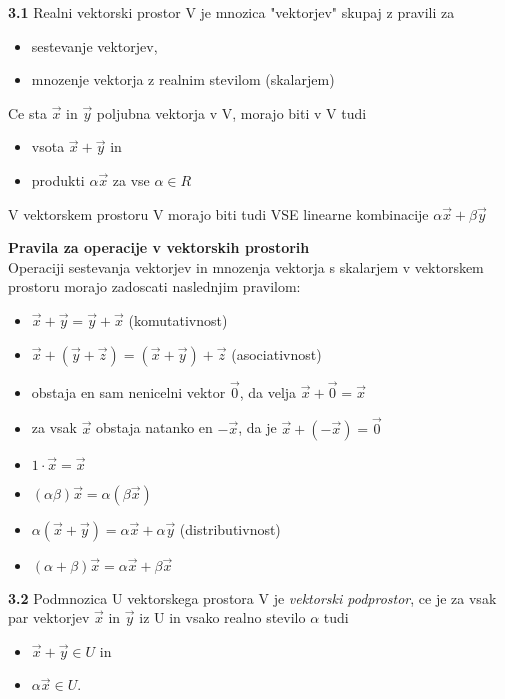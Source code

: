 \documentclass{article}
\begin{document}
\begin{multicols}{4}
	\textbf{3.1} Realni vektorski prostor V je mnozica "vektorjev" skupaj z pravili za
	\begin{itemize}
		\item sestevanje vektorjev,
		\item mnozenje vektorja z realnim stevilom (skalarjem)
	\end{itemize}
	Ce sta $\vec{x}$ in $\vec{y}$ poljubna vektorja v V, morajo biti v V tudi
	\begin{itemize}
		\item vsota $\vec{x} + \vec{y}$ in
		\item produkti $\alpha\vec{x}$ za vse $\alpha \in R$
	\end{itemize}
	V vektorskem prostoru V morajo biti tudi VSE linearne kombinacije
	$\alpha\vec{x} + \beta\vec{y}$

	\textbf{Pravila za operacije v vektorskih prostorih}\\
	Operaciji sestevanja vektorjev in mnozenja vektorja s skalarjem v vektorskem prostoru
	morajo zadoscati naslednjim pravilom:
	\begin{itemize}
		\item $\vec{x} + \vec{y} = \vec{y} + \vec{x}$ (komutativnost)
		\item $\vec{x} + (\vec{y} + \vec{z}) = (\vec{x} + \vec{y}) + \vec{z}$ (asociativnost)
		\item obstaja en sam nenicelni vektor $\vec{0}$, da velja $\vec{x} + \vec{0} = \vec{x}$
		\item za vsak $\vec{x}$ obstaja natanko en $-\vec{x}$, da je $\vec{x} + (-\vec{x}) = \vec{0}$
		\item $1 \cdot \vec{x} = \vec{x}$
		\item $(\alpha\beta)\vec{x} = \alpha(\beta\vec{x})$
		\item $\alpha(\vec{x} + \vec{y}) = \alpha\vec{x} + \alpha\vec{y}$ (distributivnost)
		\item $(\alpha + \beta)\vec{x} = \alpha\vec{x} + \beta\vec{x}$
	\end{itemize}

	\textbf{3.2} Podmnozica U vektorskega prostora V je \textit{vektorski podprostor}, ce je za
	vsak par vektorjev $\vec{x}$ in $\vec{y}$ iz U in vsako realno stevilo $\alpha$ tudi
	\begin{itemize}
		\item $\vec{x} + \vec{y} \in U$ in
		\item $\alpha\vec{x} \in U$.
	\end{itemize}


\end{multicols}
\end{document}
